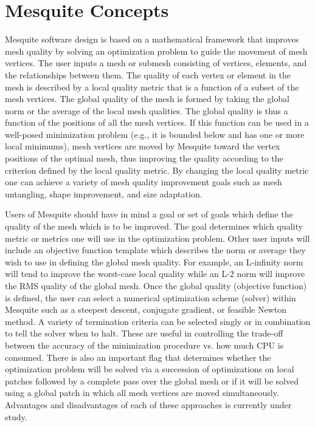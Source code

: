 \section{Mesquite Concepts} \label{sec:concepts}

Mesquite software design is based on a mathematical
framework that improves mesh quality by solving an optimization
problem to guide the movement of mesh vertices. The user inputs a mesh or
submesh consisting of vertices, elements, and the relationships between them.
The quality of each vertex or
element in the mesh is described by a local quality metric that is a function
of a subset of the mesh vertices. The global quality of the mesh is formed by
taking the global norm or the average of the local mesh qualities. The global
quality is thus a function of the positions of all the mesh vertices. If this
function can be used in a well-posed minimization problem (e.g., it is
bounded below and has one or more local minimums), mesh vertices are moved
by Mesquite toward the vertex positions of the optimal mesh, thus improving
the quality according to the criterion defined by the local quality metric.
By changing the local quality metric one can achieve a variety of mesh quality improvement goals such as mesh untangling, shape improvement, and size adaptation. \newline

Users of Mesquite should have in mind a goal or set of goals which define
the quality of the mesh which is to be improved. The goal determines which
quality metric or metrics one will use in the optimization problem. Other
user inputs will include an objective function template which describes
the norm or average they wish to use in defining the global mesh quality.
For example, an L-infinity norm will tend to improve the worst-case local
quality while an L-2 norm will improve the RMS quality of the global mesh.
Once the global quality (objective function) is defined, the user can
select a numerical optimization scheme (solver) within Mesquite such as a
steepest descent, conjugate gradient, or feasible Newton method. A variety of
termination criteria can be selected singly or in combination to tell the
solver when to halt. These are useful in controlling the trade-off between
the accuracy of the minimization procedure vs. how much CPU is consumed.
There is also an important flag that determines whether the optimization
problem will be solved via a succession of optimizations on local patches
followed by a complete pass over the global mesh or if it will be solved using
a global patch in which all mesh vertices are moved simultaneously. Advantages
and disadvantages of each of these approaches is currently under study.\newline

